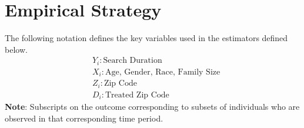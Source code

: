 \documentclass[a4paper,12pt]{article}
\begin{document}
 




\section{Empirical Strategy}
The following notation defines the key variables used in the estimators defined below. 
\begin{align*}
    &Y_i:  \textrm{Search Duration}\\
    &X_i: \textrm{Age, Gender, Race, Family Size}\\ 
    &Z_i: \textrm{Zip Code} \\
    &D_i: \textrm{Treated Zip Code}
\end{align*}
\textbf{Note}: Subscripts on the outcome corresponding to subsets of individuals who are observed in that corresponding time period. 
\end{document}
